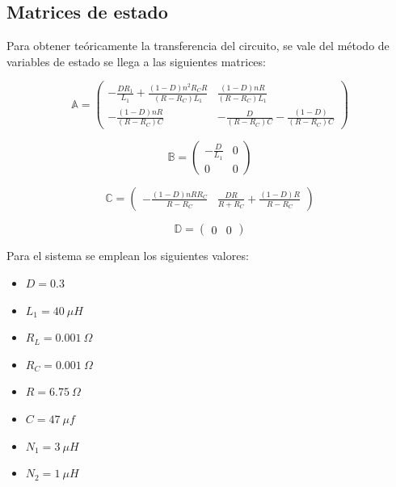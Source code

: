 %
%
%

\subsection{Matrices de estado}

Para obtener teóricamente la transferencia del circuito, se vale del método de variables de estado se llega a las siguientes matrices:

\begin{multicols}{2}
\begin{equation}
\mathbb{A} = 
\begin{pmatrix}
-\frac{DR_1}{L_1} + \frac{(1 - D) n^2 R_C R}{(R - R_C) L_1} & \frac{(1-D) n R}{(R - R_C) L_1}\\
-\frac{(1 - D) n R}{(R - R_C) C} & -\frac{D }{(R - R_C) C} - \frac{(1 - D)}{(R - R_C) C}
\end{pmatrix}
\end{equation}

\begin{equation}
\mathbb{B} = 
\begin{pmatrix}
	-\frac{D}{L_1} & 0\\
	0 & 0
\end{pmatrix}
\end{equation}

\begin{equation}
\mathbb{C} = 
\begin{pmatrix}
	-\frac{(1-D)n R R_C}{R - R_C} & \frac{D R}{R + R_C} + \frac{(1-D) R}{R - R_C}
\end{pmatrix}
\end{equation}

\begin{equation}
\mathbb{D} = 
\begin{pmatrix}
	0 & 0
\end{pmatrix}
\end{equation}
\end{multicols}

Para el sistema se emplean los siguientes valores:
\begin{multicols}{2}
\begin{itemize}
	\item $D = 0.3$
	\item $L_1 = 40 \ \mu H$
	\item $R_L = 0.001 \ \Omega$
	\item $R_C = 0.001 \ \Omega$
	\item $R = 6.75 \ \Omega$
	\item $C = 47 \ \mu f$
	\item $N_1 = 3 \ \mu H$
	\item $N_2 = 1 \ \mu H$
\end{itemize}
\end{multicols}


